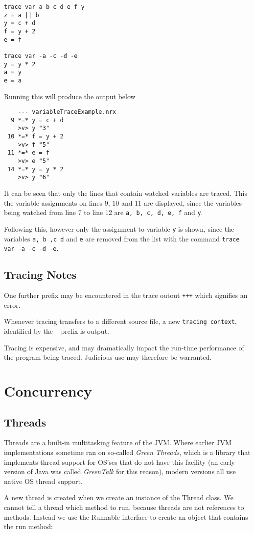 {\begin{lstlisting}[label=Trace2, caption=Trace Example 2]
trace var a b c d e f y
z = a || b
y = c + d
f = y + 2
e = f

trace var -a -c -d -e 
y = y * 2
a = y
e = a
\end{lstlisting}
Running this will produce the output below
\begin{verbatim}
    --- variableTraceExample.nrx 
  9 *=* y = c + d
    >v> y "3" 
 10 *=* f = y + 2
    >v> f "5" 
 11 *=* e = f
    >v> e "5" 
 14 *=* y = y * 2
    >v> y "6" 
\end{verbatim}
It can be seen that only the lines that contain watched variables are traced. This the variable assignments on lines 9, 10 and 11 are displayed, since the variables being watched from line 7 to line 12 are \texttt{a, b, c, d, e, f} and \texttt{y}.

Following this, however only the assignment to variable \texttt{y} is shown, since the variables \texttt{a, b ,c d} and \texttt{e} are removed from the list with the command \mbox{\texttt{trace var -a -c -d -e}}.

\section{Tracing Notes}
One further prefix may be encountered in the trace outout \texttt{+++} which signifies an error.

Whenever tracing transfers to a different source file, a new \texttt{tracing context}, identified by the \texttt{---} prefix is output.

Tracing is expensive, and may dramatically impact the run-time performance of the program being traced. Judicious use may therefore be warranted.

\chapter{Concurrency}
\section{Threads}
Threads are a built-in multitasking feature of the JVM. Where earlier
JVM implementations sometime ran on so-called \emph{Green Threads},
which is a library that implements thread support for OS'ses that do
not have this facility (an
early version of Java was called \emph{GreenTalk} for this reason), modern versions
all use native OS thread support. 

A new thread is created when we create an instance of the Thread class. We cannot tell a thread which method to run, because threads are not references to methods. Instead we use the Runnable interface to create an object that contains the run method:

}
